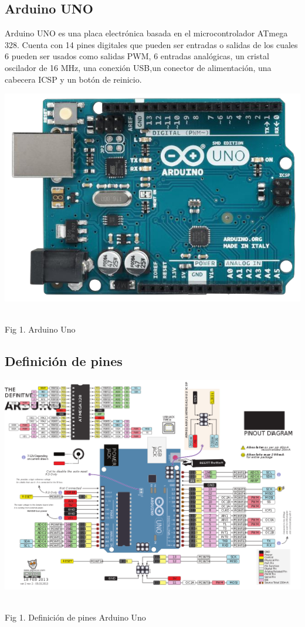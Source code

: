 \documentclass[letterpaper, 10 pt, conference]{ieeeconf}
\begin{document}
\subsection{Arduino UNO}

Arduino UNO es una placa electrónica basada en el microcontrolador ATmega 328. Cuenta con 14 pines digitales que pueden ser entradas o salidas de los cuales 6 pueden ser usados como salidas PWM, 6 entradas analógicas, un cristal oscilador de 16 MHz, una conexión USB,un conector de alimentación, una cabecera ICSP y un botón de reinicio.
\begin{center}
\includegraphics[scale=0.3]{Documento/Figuras/fig1.png}
\begin{scriptsize}\\ 
Fig 1. Arduino Uno
\end{scriptsize}
\end{center}

\subsection{Definición de pines}
\begin{center}
\includegraphics[scale=0.2]{Documento/Figuras/fig2.png}
\begin{scriptsize}\\ 
Fig 1. Definición de pines Arduino Uno
\end{scriptsize}
\end{center}
\end{document}
